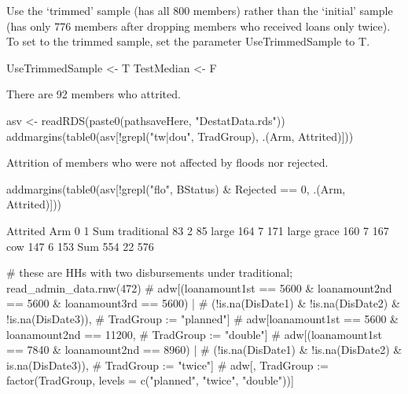 Use the `trimmed' sample (has all 800 members) rather than the `initial' sample (has only 776 members after dropping members who received loans only twice). To set to the trimmed sample, set the parameter \textsf{UseTrimmedSample} to T.
\begin{Schunk}
\begin{Sinput}
UseTrimmedSample <- T
TestMedian <- F
\end{Sinput}
\end{Schunk}
There are 92 members who attrited.
\begin{Schunk}
\begin{Sinput}
asv <- readRDS(paste0(pathsaveHere, "DestatData.rds"))
addmargins(table0(asv[!grepl("tw|dou", TradGroup), .(Arm, Attrited)]))
\end{Sinput}
\end{Schunk}
Attrition of members who were not affected by floods nor rejected.
\begin{Schunk}
\begin{Sinput}
addmargins(table0(asv[!grepl("flo", BStatus) & Rejected == 0, .(Arm, Attrited)]))
\end{Sinput}
\begin{Soutput}
             Attrited
Arm             0   1 Sum
  traditional  83   2  85
  large       164   7 171
  large grace 160   7 167
  cow         147   6 153
  Sum         554  22 576
\end{Soutput}
\begin{Sinput}
# these are HHs with two disbursements under traditional; read_admin_data.rnw(472)
# adw[(loanamount1st == 5600 & loanamount2nd == 5600 & loanamount3rd == 5600) |
#   (!is.na(DisDate1) & !is.na(DisDate2) & !is.na(DisDate3)), 
#   TradGroup := "planned"]
# adw[loanamount1st == 5600 & loanamount2nd == 11200, 
#   TradGroup := "double"]
# adw[(loanamount1st == 7840 & loanamount2nd == 8960) | 
#   (!is.na(DisDate1) & !is.na(DisDate2) & is.na(DisDate3)), 
#   TradGroup := "twice"]
# adw[, TradGroup := factor(TradGroup, levels = c("planned", "twice", "double"))]
\end{Sinput}
\end{Schunk}
